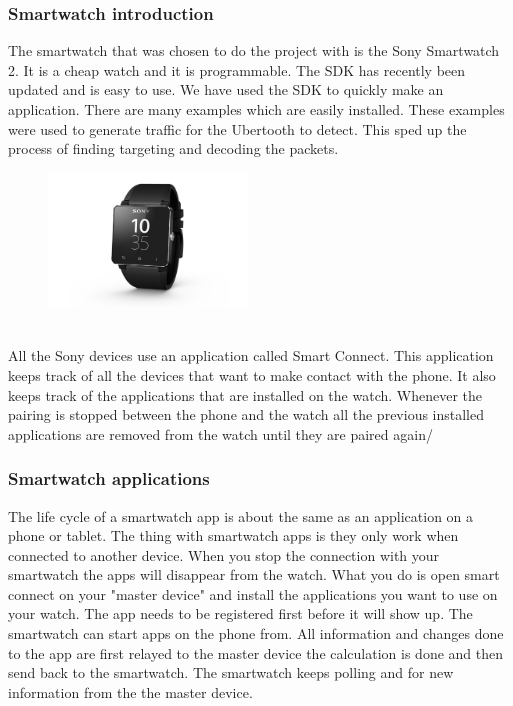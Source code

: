 \subsubsection{Smartwatch introduction}
\label{subsec:sw2}
The smartwatch that was chosen to do the project with is the Sony 
Smartwatch 2. It is a cheap watch and it is programmable. The SDK has recently been updated and is easy to use. We have used the SDK to quickly make an application. There are many examples which are easily installed. These examples were used to generate traffic for the Ubertooth to detect. This sped up the process of finding targeting and decoding the packets. 
\begin{figure}[!h]
  \begin{center}
	\includegraphics[width=200px]{images/sw2.jpg}
	\label{Sony Smartwatch 2}
  \end{center}
\end{figure}
\\
All the Sony devices use an application called Smart Connect. This application keeps track of all the devices that want to make contact with the phone. It also keeps track of the applications that are installed on the watch. Whenever the pairing is stopped between the phone and the watch all the previous installed applications are removed from the watch until they are paired again/
\subsubsection{Smartwatch applications}
\label{subsubsec:sw_app}
The life cycle of a smartwatch app is about the same as an application on a phone or tablet. The thing with smartwatch apps is they only work when connected to another device. When you stop the connection with your smartwatch the apps will disappear from the watch. What you do is open smart connect on your "master device" and install the applications you want to use on your watch. The app needs to be registered first before it will show up. The smartwatch can start apps on the phone from. All information and changes done to the app are first relayed to the master device the calculation is done and then send back to the smartwatch. The smartwatch keeps polling and for new information from the the master device. 